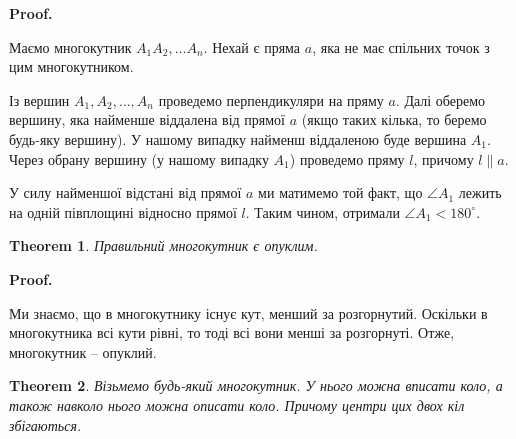 \documentclass[a4paper, 10pt]{article}
\makeatletter
\theoremstyle{theoremdd}
\newtheorem{theorem}{Theorem}[subsection]
\theoremstyle{theoremdd}
\theoremstyle{theoremdd}
\theoremstyle{theoremdd}
\theoremstyle{theoremdd}
\theoremstyle{theoremdd}
\theoremstyle{theoremdd}
\theoremstyle{theoremdd}
\theoremstyle{theoremdd}
\renewenvironment{proof}[1][Proof.\\]{\par
\pushQED{\hfill \qed}%
\normalfont \topsep6\p@\@plus6\p@\relax
\trivlist
\item\relax
{\bfseries
#1\@addpunct{.}}\hspace\labelsep\ignorespaces
}{%
\popQED\endtrivlist\@endpefalse
}
\makeatother
\begin{document}
\begin{proof}
Маємо многокутник $A_1A_2,\dots A_n$. Нехай є пряма $a$, яка не має спільних точок з цим многокутником.
\begin{figure}[H]
\centering
{}
\end{figure}
Із вершин $A_1,A_2,\dots,A_n$ проведемо перпендикуляри на пряму $a$. Далі оберемо вершину, яка найменше віддалена від прямої $a$ (якщо таких кілька, то беремо будь-яку вершину). У нашому випадку найменш віддаленою буде вершина $A_1$.\\
Через обрану вершину (у нашому випадку $A_1$) проведемо пряму $l$, причому $l \parallel a$.\\
\begin{figure}[H]
\centering
{}
\end{figure}
У силу найменшої відстані від прямої $a$ ми матимемо той факт, що $\angle A_1$ лежить на одній півплощині відносно прямої $l$. Таким чином, отримали $\angle A_1 < 180^\circ$. 
\end{proof}

\begin{theorem}
Правильний многокутник є опуклим.
\end{theorem}

\begin{proof}
Ми знаємо, що в многокутнику існує кут, менший за розгорнутий. Оскільки в многокутника всі кути рівні, то тоді всі вони менші за розгорнуті. Отже, многокутник -- опуклий.
\end{proof}

\begin{theorem}
Візьмемо будь-який многокутник. У нього можна вписати коло, а також навколо нього можна описати коло. Причому центри цих двох кіл збігаються.
\end{theorem}
\end{document}
